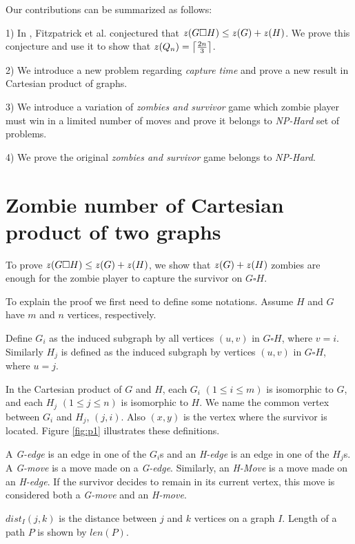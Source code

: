\documentclass[1p]{elsarticle}
\DeclarePairedDelimiter\ceil{\lceil}{\rceil} \DeclarePairedDelimiter\floor{\lfloor}{\rfloor}
\newcommand{\zn}{\ooalign{$z$\cr\hfil\rule[.5ex]{.2em}{.08ex}\hfil\cr}}
\begin{document}
Our contributions can be summarized as follows:

1) In \cite{Fitz16}, Fitzpatrick et al. conjectured that $\zn(G \square H) \leq \zn(G) + \zn(H)$. We prove this conjecture and
use it to show that $\zn(Q_n) = \ceil*{\frac{2n}{3}}$. 

2) We introduce a new problem regarding {\it capture time} and prove a new result in Cartesian product of graphs.

3) We introduce a variation of {\it zombies and survivor} game which zombie player must win in a limited number of
moves and prove it belongs to {\it NP-Hard} set of problems.

4) We prove the original {\it zombies and survivor} game belongs to {\it NP-Hard}.


\section{Zombie number of Cartesian product of two graphs}\label{conj-proof}

To prove $\zn(G \square H) \leq \zn(G) + \zn(H)$, we show that $\zn(G) + \zn(H)$ zombies are enough for the zombie player to
capture the survivor on $G \square H$.

To explain the proof we first need to define some notations. Assume $H$ and $G$ have $m$ and $n$ vertices,
respectively. 

Define $G_{i}$ as the induced subgraph by all vertices $(u,v)$ in $G \square H$, where $v=i$. Similarly
$H_{j}$ is defined as the induced subgraph by vertices $(u,v)$ in $G \square H$, where $u=j$.

In the Cartesian product of $G$ and $H$, each $G_{i}$ $(1 \leq i \leq m)$ is isomorphic to $G$, and each $H_{j}$ $(1
\leq j \leq n)$ is isomorphic to $H$. We name the common vertex between $G_{i}$ and $H_{j}$, $(j,i)$. Also $(x,y)$ is
the vertex where the survivor is located. Figure \ref{fig:p1} illustrates these definitions.

A {\it G-edge} is an edge in one of the $G_{i}$s and an {\it H-edge} is an edge in one of the $H_{j}$s. A {\it G-move}
is a move made on a {\it G-edge}. Similarly, an {\it H-Move} is a move made on an {\it H-edge}. If the survivor decides
to remain in its current vertex, this move is considered both a {\it G-move} and an {\it H-move}. 

$dist_I(j,k)$ is the distance between $j$ and $k$ vertices on a graph $I$. Length of a path $P$ is shown by $len(P)$. 
\end{document}
